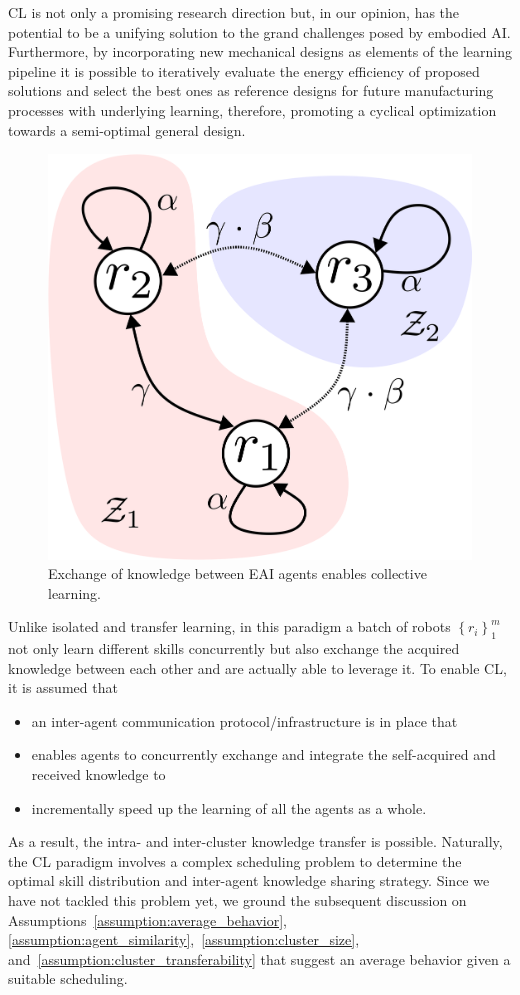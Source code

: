 CL is not only a promising research direction but, in our opinion, has the potential to be a unifying solution to the grand challenges posed by embodied AI. Furthermore, by incorporating new mechanical designs as elements of the learning pipeline it is possible to iteratively evaluate the energy efficiency of proposed solutions and select the best ones as reference designs for future manufacturing processes with underlying learning, therefore, promoting a cyclical optimization towards a semi-optimal general design.
\begin{figure}[!th]
	\centering
	\includegraphics[width=0.7\columnwidth]{fig/cl_example_figure.png}
	\caption{Exchange of knowledge between EAI agents enables collective learning.}
	\label{fig:cl_example_figure}
\end{figure}

Unlike isolated and transfer learning, in this paradigm a batch of robots $\left \lbrace r_i \right \rbrace^m_{1}$ not only learn different skills concurrently but also exchange the acquired knowledge between each other and are actually able to leverage it. To enable CL, it is assumed that
\begin{itemize}
	\item an inter-agent communication protocol/infrastructure is in place that
	\item enables agents to concurrently exchange and integrate the self-acquired and received knowledge to
	\item incrementally speed up the learning of all the agents as a whole.
\end{itemize}
As a result, the intra- and inter-cluster knowledge transfer is possible. Naturally, the CL paradigm involves a complex scheduling problem to determine the optimal skill distribution and inter-agent knowledge sharing strategy. Since we have not tackled this problem yet, we ground the subsequent discussion on Assumptions~\ref{assumption:average_behavior}, \ref{assumption:agent_similarity},~\ref{assumption:cluster_size}, and~\ref{assumption:cluster_transferability} that suggest an average behavior given a suitable scheduling.

